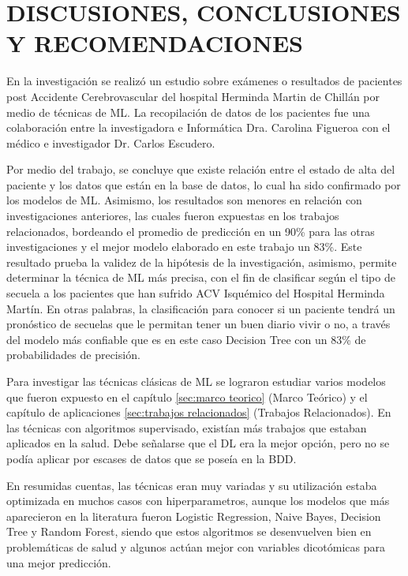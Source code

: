 \doublespacing
\chapter{DISCUSIONES, CONCLUSIONES Y RECOMENDACIONES}

\par En la investigación se realizó un estudio sobre exámenes o resultados de pacientes post Accidente Cerebrovascular del hospital Herminda Martin de Chillán por medio de técnicas de ML. La recopilación de datos de los pacientes fue una colaboración entre la investigadora e Informática Dra. Carolina Figueroa con el médico e investigador Dr. Carlos Escudero.\\

\par Por medio del trabajo, se concluye que existe relación entre el estado de alta del paciente y los datos que están en la base de datos, lo cual ha sido confirmado por los modelos de ML. Asimismo, los resultados son menores en relación con investigaciones anteriores, las cuales fueron expuestas en los trabajos relacionados, bordeando el promedio de predicción en un 90\% para las otras investigaciones y el mejor modelo elaborado en este trabajo un 83\%. Este resultado prueba la validez de la hipótesis de la investigación, asimismo, permite determinar la técnica de ML más precisa, con el fin de clasificar según el tipo de secuela a los pacientes que han sufrido ACV Isquémico del Hospital Herminda Martín. En otras palabras, la clasificación para conocer si un paciente tendrá un pronóstico de secuelas que le permitan tener un buen diario vivir o no, a través del modelo más confiable que es en este caso Decision Tree con un 83\% de probabilidades de precisión.\\

\par Para investigar las técnicas clásicas de ML se lograron estudiar varios modelos que fueron expuesto en el  capítulo \ref{sec:marco teorico} (Marco Teórico) y el capítulo de aplicaciones \ref{sec:trabajos relacionados} (Trabajos Relacionados). En las técnicas con algoritmos supervisado, existían más trabajos que estaban aplicados en la salud. Debe señalarse que el DL era la mejor opción, pero no se podía aplicar por escases de datos que se poseía en la BDD.\\

\par En resumidas cuentas, las técnicas eran muy variadas y su utilización estaba optimizada en muchos casos con hiperparametros, aunque los modelos que más aparecieron en la literatura fueron Logistic Regression, Naive Bayes, Decision Tree y Random Forest, siendo que estos algoritmos se desenvuelven bien en problemáticas de salud y algunos actúan mejor con variables dicotómicas para una mejor predicción.\\

